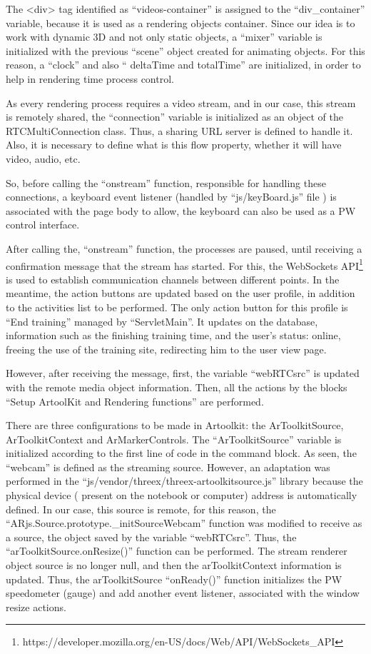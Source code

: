 The <div> tag identified as ``videos-container'' is assigned to the ``div\_container'' variable, because it is used as a rendering objects container. Since our idea is to work with dynamic 3D and not only static objects, a ``mixer'' variable is initialized with the previous ``scene'' object created for animating objects. For this reason, a ``clock'' and also `` deltaTime and totalTime'' are initialized, in order to help in rendering time process control.

As every rendering process requires a video stream, and in our case, this stream is remotely shared, the ``connection'' variable is initialized as an object of the RTCMultiConnection class. Thus, a sharing URL server is defined to handle it. Also, it is necessary to define what is this flow property, whether it will have video, audio, etc. 

So, before calling the ``onstream'' function, responsible for handling these connections, a keyboard event listener (handled by ``js/keyBoard.js'' file ) is associated with the page body to allow, the keyboard can also be used as a PW control interface. 

After calling the, ``onstream'' function, the processes are paused, until receiving a confirmation message that the stream has started. For this, the WebSockets API\footnote{https://developer.mozilla.org/en-US/docs/Web/API/WebSockets\_API} is used to establish communication channels between different points. In the meantime, the action buttons are updated based on the user profile, in addition to the activities list to be performed. The only action button for this profile is ``End training'' managed by ``ServletMain''. It updates on the database, information such as the finishing training time, and the user's status: online, freeing the use of the training site, redirecting him to the user view page.

However, after receiving the message, first, the variable ``webRTCsrc'' is updated with the remote media object information. Then, all the actions by the blocks ``Setup ArtoolKit and Rendering functions'' are performed. 

There are three configurations to be made in Artoolkit: the ArToolkitSource, ArToolkitContext and ArMarkerControls. The ``ArToolkitSource'' variable is initialized according to the first line of code in the command block. As seen, the ``webcam'' is defined as the streaming source. However, an adaptation was performed in the ``js/vendor/threex/threex-artoolkitsource.js'' library because the physical device ( present on the notebook or computer) address is automatically defined. In our case, this source is remote, for this reason, the ``ARjs.Source.prototype.\_initSourceWebcam'' function was modified to receive as a source, the object saved by the variable ``webRTCsrc''. Thus, the ``arToolkitSource.onResize()'' function can be performed. The stream renderer object source is no longer null, and then the arToolkitContext information is updated. Thus, the arToolkitSource ``onReady()'' function initializes the PW speedometer (gauge) and add another event listener, associated with the window resize actions.\newline

